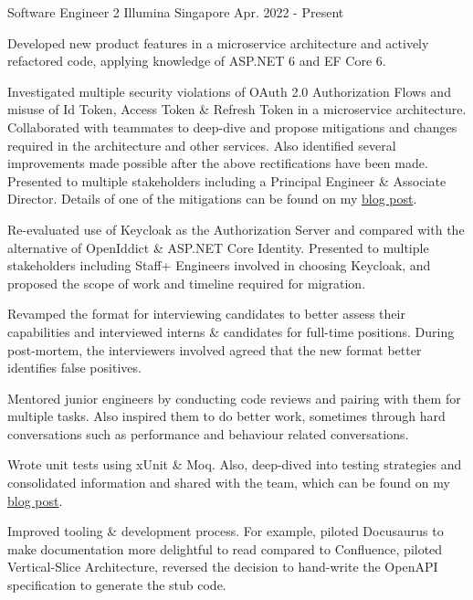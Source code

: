 

\begin{cventries}

\cventry
{Software Engineer 2} %
{Illumina} %
{Singapore} %
{Apr. 2022 - Present} %
{
  \begin{cvitems} %
    \item {Developed new product features in a microservice architecture and actively refactored code, applying knowledge of ASP.NET 6 and EF Core 6.}
    \item {Investigated multiple security violations of OAuth 2.0 Authorization Flows and misuse of Id Token, Access Token \& Refresh Token in a microservice architecture. Collaborated with teammates to deep-dive and propose mitigations and changes required in the architecture and other services. Also identified several improvements made possible after the above rectifications have been made. Presented to multiple stakeholders including a Principal Engineer \& Associate Director. Details of one of the mitigations can be found on my \href{https://zhiyuan-amos.github.io/blog/2023-02-07-access-token-short-lived-authorization-microservice/}{blog post}.}
    \item {Re-evaluated use of Keycloak as the Authorization Server and compared with the alternative of OpenIddict \& ASP.NET Core Identity. Presented to multiple stakeholders including Staff+ Engineers involved in choosing Keycloak, and proposed the scope of work and timeline required for migration.}
    \item {Revamped the format for interviewing candidates to better assess their capabilities and interviewed interns \& candidates for full-time positions. During post-mortem, the interviewers involved agreed that the new format better identifies false positives.}
    \item {Mentored junior engineers by conducting code reviews and pairing with them for multiple tasks. Also inspired them to do better work, sometimes through hard conversations such as performance and behaviour related conversations.}
    \item {Wrote unit tests using xUnit \& Moq. Also, deep-dived into testing strategies and consolidated information and shared with the team, which can be found on my \href{https://zhiyuan-amos.github.io/blog/2023-02-07-test-principles/}{blog post}.}
    \item {Improved tooling \& development process. For example, piloted Docusaurus to make documentation more delightful to read compared to Confluence, piloted Vertical-Slice Architecture, reversed the decision to hand-write the OpenAPI specification to generate the stub code.}
  \end{cvitems}
}


\end{cventries}
